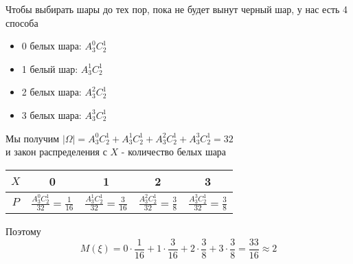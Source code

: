 \begin{exercise}[6]
	Чтобы выбирать шары до тех пор, пока не будет вынут черный шар, у нас есть 4 способа
	\begin{itemize}
		\item 0 белых шара: $A^0_3 C^1_2$
		\item 1 белый шар: $A^1_3 C^1_2$
		\item 2 белых шара: $A^2_3 C^1_2$
		\item 3 белых шара: $A^3_3 C^1_2$
	\end{itemize}
	Мы получим $| \Omega | = A^0_3 C^1_2 + A^1_3 C^1_2 + A^2_3 C^1_2 + A^3_3 C^1_2 = 32$ \\ и закон распределения с $X$ - количество белых шара
	\begin{center}
		\begin{tabular}{|c | c | c | c | c |}
			\hline
			$X$ & 0 & 1 & 2 & 3 \\ \hline
			$P$ & $\frac{A^0_3 C^1_2}{32} = \frac{1}{16}$ & $\frac{A^1_3 C^1_2}{32} = \frac{3}{16}$ & $\frac{A^2_3 C^1_2}{32} = \frac{3}{8}$ & $\frac{A^3_3 C^1_2}{32} = \frac{3}{8}$ \\ \hline
		\end{tabular}
	\end{center}
	Поэтому
	$$M(\xi) = 0 \cdot \frac{1}{16} + 1 \cdot \frac{3}{16} + 2 \cdot \frac{3}{8} + 3 \cdot \frac{3}{8} = \frac{33}{16} \approx 2$$
\end{exercise}

